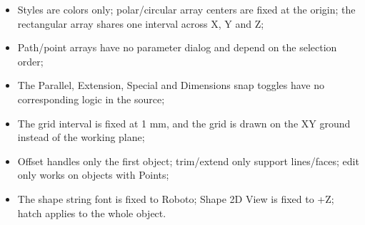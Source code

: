 \begin{itemize}
  \item Styles are colors only; polar/circular array centers are fixed at the origin; the
        rectangular array shares one interval across X, Y and Z;
  \item Path/point arrays have no parameter dialog and depend on the selection order;
  \item The Parallel, Extension, Special and Dimensions snap toggles have no corresponding logic in
        the source;
  \item The grid interval is fixed at 1 mm, and the grid is drawn on the XY ground instead of the
        working plane;
  \item Offset handles only the first object; trim/extend only support lines/faces; edit only works
        on objects with Points;
  \item The shape string font is fixed to Roboto; Shape 2D View is fixed to +Z; hatch applies to the
        whole object.
\end{itemize}
